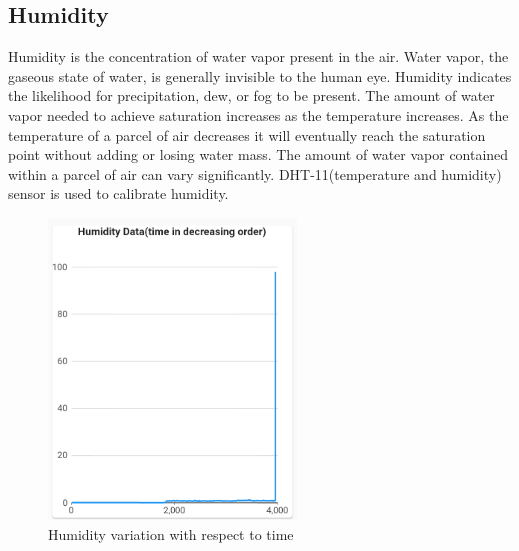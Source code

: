 \subsection{Humidity}
Humidity is the concentration of water vapor present in the air. Water vapor, the gaseous state of water, is generally invisible to the human eye. Humidity indicates the likelihood for precipitation, dew, or fog to be present. The amount of water vapor needed to achieve saturation increases as the temperature increases. As the temperature of a parcel of air decreases it will eventually reach the saturation point without adding or losing water mass. The amount of water vapor contained within a parcel of air can vary significantly. DHT-11(temperature and humidity) sensor is used to calibrate humidity.

\begin{figure}[!ht]
\centering
\includegraphics[width=\linewidth,height=8cm]{figures/humidity.png}
\caption{\label{img47} Humidity variation with respect to time}
\end{figure}


